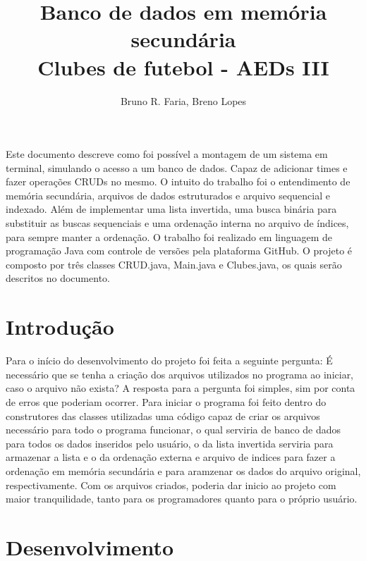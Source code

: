 \documentclass[12pt]{article}
\title{Banco de dados em memória secundária\\ Clubes de futebol - AEDs III}
\author{Bruno R. Faria\inst{1}, Breno Lopes\inst{2}}
\begin{document}
 

\maketitle
     
\begin{resumo} 
  Este documento descreve como foi possível a montagem de um sistema em terminal, simulando o acesso a um banco de dados. Capaz de adicionar times e fazer operações CRUDs no mesmo. O intuito do trabalho foi o entendimento de memória secundária, arquivos de dados estruturados e arquivo sequencial e indexado. Além de implementar uma lista invertida, uma busca binária para substituir as buscas sequenciais e uma ordenação interna no arquivo de índices, para sempre manter a ordenação. O trabalho foi realizado em linguagem de programação Java com controle de versões pela plataforma GitHub. O projeto é composto por três classes CRUD.java, Main.java e Clubes.java, os quais serão descritos no documento.
\end{resumo}


\section{Introdução}

Para o início do desenvolvimento do projeto foi feita a seguinte pergunta: É necessário que se tenha a criação dos arquivos utilizados no programa ao iniciar, caso o arquivo não exista? A resposta para a pergunta foi simples, sim por conta de erros que poderiam ocorrer. Para iniciar o programa foi feito dentro do construtores das classes utilizadas uma código capaz de criar os arquivos necessário para todo o programa funcionar, o qual serviria de banco de dados para todos os dados inseridos pelo usuário, o da lista invertida serviria para armazenar a lista e o da ordenação externa e arquivo de indices para fazer a ordenação em memória secundária e para aramzenar os dados do arquivo original, respectivamente. Com os arquivos criados, poderia dar inicio ao projeto com maior tranquilidade, tanto para os programadores quanto para o próprio usuário.


\section{Desenvolvimento} \label{sec:firstpage}
\end{document}
